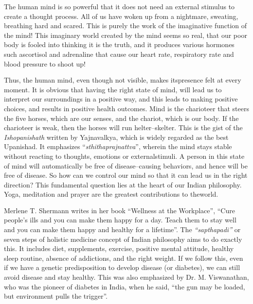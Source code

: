 The human mind is so powerful that it does not need an external stimulus to create a thought process. All of us have woken up from a nightmare, sweating, breathing hard and scared. This is purely the work of the imaginative function of the mind! This imaginary world created by the mind seems so real, that our poor body is fooled into thinking it is the truth, and it produces various hormones such as\break cortisol and adrenaline that cause our heart rate, respiratory rate and blood pressure to shoot up!

Thus, the human mind, even though not visible, makes its\break presence felt at every moment. It is obvious that having the right state of mind, will lead us to interpret our surroundings in a positive way, and this leads to making positive choices, and results in positive health outcomes. Mind is the charioteer that steers the five horses, which are our senses, and the chariot, which is our body. If the chario\-teer is weak, then the horses will run helter–skelter. This is the gist of the \textit{Ishopanishath} written by Yajnavalkya, which is widely regarded as the best Upanishad. It emphasizes “\textit{sthithaprajnattva}”, wherein the mind stays stable without reacting to thoughts, emotions or external\break stimuli. A person in this state of mind will automatically be free of disease–causing behaviors, and hence will be free of disease. So how can we control our mind so that it can lead us in the right direction? This fundamental question lies at the heart of our Indian philosophy. Yoga, meditation and prayer are the greatest contributions to the\break world.

Merlene T. Shermann writes in her book “Wellness at the Workplace”, “Cure people’s ills and you can make them happy for a day. Teach them to stay well and you can make them happy and healthy for a lifetime”. The \textit{“sapthapadi”} or seven steps of holistic medicine concept of Indian philosophy aims to do exactly this. It includes diet, supplements, exercise, positive mental attitude, healthy sleep routine, absence of addictions, and the right weight. If we follow this, even if we have a genetic predisposition to develop disease (or diabetes), we can still avoid disease and stay healthy. This was also emphasized by Dr. M. Viswanathan, who was the pioneer of diabetes in India, when he said, “the gun may be loaded, but environment pulls the trigger”.


